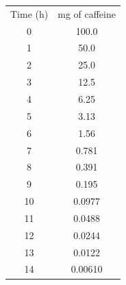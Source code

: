 \documentclass[12pt]{article}
\begin{document}
                \begin{center}
                        \begin{tabular}{cc}
                        Time (h) & mg of caffeine       \\
                        0 & 100.0\\ 
                        1 & 50.0  \\ 
                        2 & 25.0   \\
                        3 & 12.5    \\ 
                        4 & 6.25     \\ 
                        5 & 3.13      \\ 
                        6 & 1.56       \\
                        7 & 0.781       \\
                        8 & 0.391        \\
                        9 & 0.195         \\ 
                        10 & 0.0977        \\ 
                        11 & 0.0488         \\ 
                        12 & 0.0244          \\ 
                        13 & 0.0122           \\
                        14 & 0.00610           \\
                        
                                           
                        \end{tabular}
                        
                \end{center}
                

        
\end{document}

